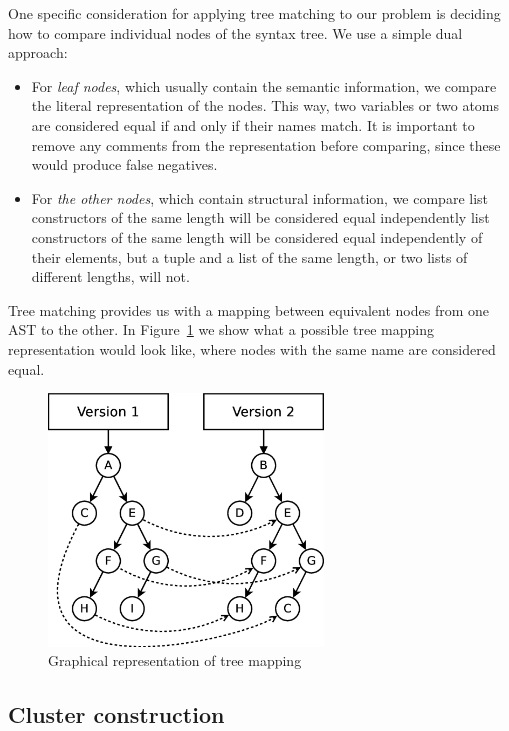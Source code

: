 One specific consideration for applying tree matching to our problem is
deciding how to compare individual nodes of the syntax tree. We use
a simple dual approach:
\begin{itemize}
\item For \emph{leaf nodes}, which usually contain the semantic information, we
compare the literal representation of the nodes. This way, two variables
or two atoms are considered equal if and only if their names match.
It is important to remove any comments from the representation before
comparing, since these would produce false negatives.
\item For \emph{the other nodes}, which contain structural information, we compare
list constructors of the same length will be considered equal independently
list constructors of the same length will be considered equal independently
of their elements, but a tuple and a list of the same length, or two
lists of different lengths, will not.
\end{itemize}
Tree matching provides us with a mapping between equivalent nodes
from one AST to the other. In Figure~\ref{fig:tree-mapping-example}
we show what a possible tree mapping representation would look like,
where nodes with the same name are considered equal.

\begin{figure}
\centering
\includegraphics[width=0.65\textwidth]{figures/automatic_beh_inf/diagrams/dia2}
\par

\caption{Graphical representation of tree mapping\label{fig:tree-mapping-example}}
\end{figure}



\subsection{Cluster construction\label{sub:cluster-cons}}

